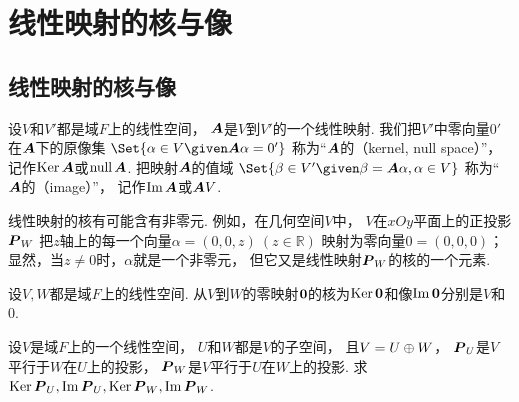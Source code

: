 \section{线性映射的核与像}
\subsection{线性映射的核与像}
\begin{definition}
设\(V\)和\(V'\)都是域\(F\)上的线性空间，
\(\boldsymbol{A}\)是\(V\)到\(V'\)的一个线性映射.
我们把\(V'\)中零向量\(0'\)在\(\boldsymbol{A}\)下的原像集
\(\Set{
	\alpha\in V
	\given
	\vb{A}\alpha=0'
}\)
称为“\(\boldsymbol{A}\)的（kernel, null space）”，
记作\(\operatorname{Ker}\boldsymbol{A}\)或\(\operatorname{null}\boldsymbol{A}\).
把映射\(\boldsymbol{A}\)的值域
\(\Set{
	\beta \in V'
	\given
	\beta = \vb{A}\alpha,
	\alpha \in V
}\)
称为“\(\boldsymbol{A}\)的（image）”，
记作\(\operatorname{Im}\boldsymbol{A}\)或\(\boldsymbol{A}V\).
\end{definition}
\begin{remark}
线性映射的核有可能含有非零元.
例如，在几何空间\(V\)中，
\(V\)在\(xOy\)平面上的正投影\(\boldsymbol{P}_W\)
把\(z\)轴上的每一个向量\(\alpha=(0,0,z)\ (z\in\mathbb{R})\)
映射为零向量\(0=(0,0,0)\)；
显然，当\(z\neq0\)时，\(\alpha\)就是一个非零元，
但它又是线性映射\(\boldsymbol{P}_W\)的核的一个元素.
\end{remark}

\begin{example}
设\(V,W\)都是域\(F\)上的线性空间.
从\(V\)到\(W\)的零映射\(\boldsymbol0\)的核为\(\operatorname{Ker}\boldsymbol0\)和像\(\operatorname{Im}\boldsymbol0\)分别是\(V\)和\(0\).
\end{example}

\begin{example}
设\(V\)是域\(F\)上的一个线性空间，
\(U\)和\(W\)都是\(V\)的子空间，
且\(V = U \oplus W\)，
\(\boldsymbol{P}_U\)是\(V\)平行于\(W\)在\(U\)上的投影，
\(\boldsymbol{P}_W\)是\(V\)平行于\(U\)在\(W\)上的投影.
求\(\operatorname{Ker}\boldsymbol{P}_U,
\operatorname{Im}\boldsymbol{P}_U,
\operatorname{Ker}\boldsymbol{P}_W,
\operatorname{Im}\boldsymbol{P}_W\).
\end{example}

